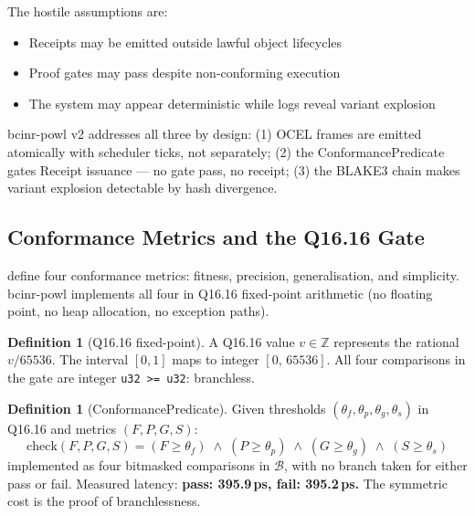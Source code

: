 \documentclass[12pt,a4paper]{article}
\theoremstyle{definition}
\newtheorem{definition}[theorem]{Definition}
\theoremstyle{remark}
\newcommand{\Zmod}{\mathbb{Z}}
\begin{document}
The hostile assumptions are:
\begin{itemize}[noitemsep]
  \item Receipts may be emitted outside lawful object lifecycles
  \item Proof gates may pass despite non-conforming execution
  \item The system may appear deterministic while logs reveal variant explosion
\end{itemize}

bcinr-powl v2 addresses all three by design:
(1) OCEL frames are emitted atomically with scheduler ticks, not separately;
(2) the ConformancePredicate gates Receipt issuance --- no gate pass, no receipt;
(3) the BLAKE3 chain makes variant explosion detectable by hash divergence.

\subsection{Conformance Metrics and the Q16.16 Gate}

\citet{rozinat2008conformance} define four conformance metrics:
fitness, precision, generalisation, and simplicity.
bcinr-powl implements all four in Q16.16 fixed-point arithmetic
(no floating point, no heap allocation, no exception paths).

\begin{definition}[Q16.16 fixed-point]
A Q16.16 value $v \in \Zmod$ represents the rational $v / 65536$.
The interval $[0,1]$ maps to integer $[0,\, 65536]$.
All four comparisons in the gate are integer \texttt{u32 >= u32}: branchless.
\end{definition}

\begin{definition}[ConformancePredicate]
Given thresholds $(\theta_f, \theta_p, \theta_g, \theta_s)$ in Q16.16
and metrics $(F, P, G, S)$:
\[
  \mathrm{check}(F,P,G,S) =
  (F \geq \theta_f) \;\wedge\; (P \geq \theta_p) \;\wedge\;
  (G \geq \theta_g) \;\wedge\; (S \geq \theta_s)
\]
implemented as four bitmasked comparisons in $\mathcal{B}$, with no branch taken for
either pass or fail.
Measured latency: \textbf{pass: 395.9\,ps, fail: 395.2\,ps.}
The symmetric cost is the proof of branchlessness.
\end{definition}
\end{document}
